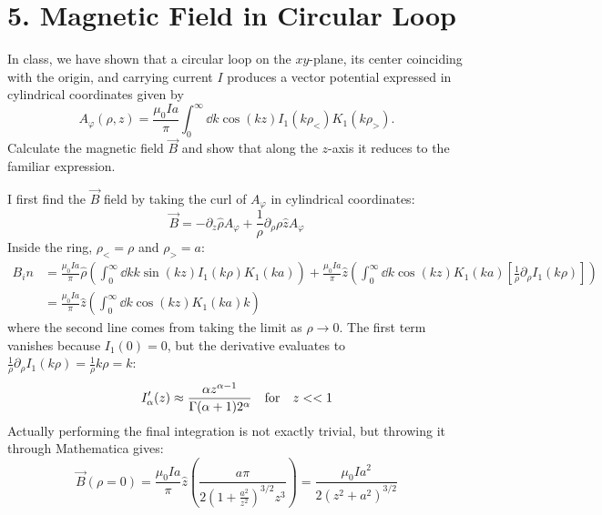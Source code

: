 \documentclass[a4paper,twoside]{article}
\begin{document}
\section*{5. Magnetic Field in Circular Loop}
In class, we have shown that a circular loop on the $ xy $-plane, its center coinciding with the origin, and carrying current $ I $ produces a vector potential expressed in cylindrical coordinates given by
\begin{equation}
    A_{\varphi}(\rho,z) = \frac{\mu_0 I a}{\pi} \int_{0}^{\infty} \dd{k} \cos(kz) I_1(k \rho_<)K_1(k \rho_>).
\end{equation}
Calculate the magnetic field $ \vec{B} $ and show that along the $ z $-axis it reduces to the familiar expression.
\begin{problem}
    I first find the $ \vec{B} $ field by taking the curl of $ A_{\varphi} $ in cylindrical coordinates:
    \begin{equation}
        \vec{B} = -\partial_z \hat{\rho} A_{\varphi} + \frac{1}{\rho} \partial_{\rho} \rho \hat{z} A_{\varphi}
    \end{equation}
    Inside the ring, $ \rho_< = \rho $ and $ \rho_> = a $:
    \begin{align}
        B_in &= \frac{\mu_0 I a}{\pi} \hat{\rho} \left( \int_0^{\infty} \dd{k} k \sin(kz) I_1(k \rho)K_1(ka) \right)+ \frac{\mu_0 I a}{\pi} \hat{z} \left( \int_0^{\infty} \dd{k} \cos(kz) K_1(ka)\left[ \frac{1}{\rho} \partial_{\rho} I_1(k \rho) \right] \right)\\
        &= \frac{\mu_0 I a}{\pi} \hat{z} \left( \int_0^{\infty} \dd{k} \cos(kz) K_1(ka) k \right)
    \end{align}
    where the second line comes from taking the limit as $ \rho \to 0 $. The first term vanishes because $ I_1(0) = 0 $, but the derivative evaluates to $ \frac{1}{\rho} \partial_{\rho}I_1(k\rho) = \frac{1}{\rho} k \rho = k $:
    \begin{equation}
        I_{\alpha}'(z) \approx \frac{\alpha z^{\alpha-1}}{\Gamma(\alpha + 1) 2^{\alpha}} \qfor z<<1
    \end{equation}
    Actually performing the final integration is not exactly trivial, but throwing it through Mathematica gives:
    \begin{equation}
        \vec{B}(\rho = 0) = \frac{\mu_0 I a}{\pi} \hat{z} \left( \frac{a \pi}{2 \left( 1+ \frac{a^2}{z^2} \right)^{3/2} z^3} \right) = \frac{\mu_0 I a^2}{2(z^2 + a^2)^{3/2}}
    \end{equation}
\end{problem}
\end{document}
